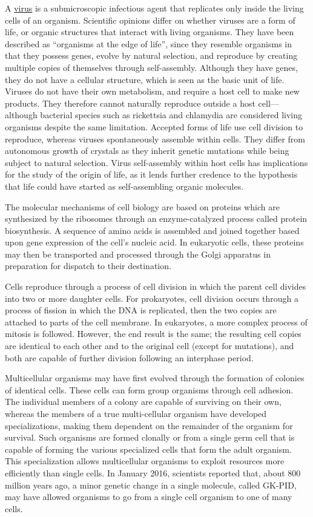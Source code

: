 A \href{https://en.wikipedia.org/wiki/Virus}{virus} is a submicroscopic infectious agent that replicates only inside the living cells of an organism. Scientific opinions differ on whether viruses are a form of life, or organic structures that interact with living organisms. They have been described as ``organisms at the edge of life'', since they resemble organisms in that they possess genes, evolve by natural selection, and reproduce by creating multiple copies of themselves through self-assembly. Although they have genes, they do not have a cellular structure, which is seen as the basic unit of life. Viruses do not have their own metabolism, and require a host cell to make new products. They therefore cannot naturally reproduce outside a host cell---although bacterial species such as rickettsia and chlamydia are considered living organisms despite the same limitation. Accepted forms of life use cell division to reproduce, whereas viruses spontaneously assemble within cells. They differ from autonomous growth of crystals as they inherit genetic mutations while being subject to natural selection. Virus self-assembly within host cells has implications for the study of the origin of life, as it lends further credence to the hypothesis that life could have started as self-assembling organic molecules.

The molecular mechanisms of cell biology are based on proteins which are synthesized by the ribosomes through an enzyme-catalyzed process called protein biosynthesis. A sequence of amino acids is assembled and joined together based upon gene expression of the cell's nucleic acid. In eukaryotic cells, these proteins may then be transported and processed through the Golgi apparatus in preparation for dispatch to their destination.

Cells reproduce through a process of cell division in which the parent cell divides into two or more daughter cells. For prokaryotes, cell division occurs through a process of fission in which the DNA is replicated, then the two copies are attached to parts of the cell membrane. In eukaryotes, a more complex process of mitosis is followed. However, the end result is the same; the resulting cell copies are identical to each other and to the original cell (except for mutations), and both are capable of further division following an interphase period.

Multicellular organisms may have first evolved through the formation of colonies of identical cells. These cells can form group organisms through cell adhesion. The individual members of a colony are capable of surviving on their own, whereas the members of a true multi-cellular organism have developed specializations, making them dependent on the remainder of the organism for survival. Such organisms are formed clonally or from a single germ cell that is capable of forming the various specialized cells that form the adult organism. This specialization allows multicellular organisms to exploit resources more efficiently than single cells. In January 2016, scientists reported that, about 800 million years ago, a minor genetic change in a single molecule, called GK-PID, may have allowed organisms to go from a single cell organism to one of many cells.

